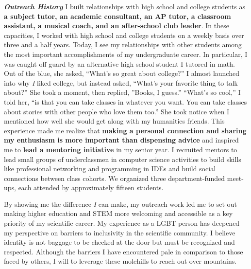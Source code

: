 \noindent
\textit{\textbf{Outreach History}}
I built relationships with high school and college students as \textbf{a subject tutor, an academic consultant, an AP tutor, a classroom assistant, a musical coach, and an after-school club leader}.
In these capacities, I worked with high school and college students on a weekly basis over three and a half years.
Today, I see my relationships with other students among the most important accomplishments of my undergraduate career.
In particular, I was caught off guard by an alternative high school student I tutored in math.
Out of the blue, she asked, ``What's so great about college?''
I almost launched into why \textit{I} liked college, but instead asked, ``What's your favorite thing to talk about?''
She took a moment, then replied, ''Books, I guess.''
``What's so cool,'' I told her, ``is that you can take classes in whatever you want.
You can take classes about stories with other people who love them too.''
She took notice when I mentioned how well she would get along with my humanities friends.
This experience made me realize that \textbf{making a personal connection and sharing my enthusiasm is more important than dispensing advice} and inspired me to \textbf{lead a mentoring initiative} in my senior year.
I recruited mentors to lead small groups of underclassmen in computer science activities to build skills like professional networking and programming in IDEs and build social connections between class cohorts.
We organized three department-funded meet-ups, each attended by approximately fifteen students.

By showing me the difference \textit{I} can make, my outreach work led me to set out making higher education and STEM more welcoming and accessible as a key priority of my scientific career.
My experience as a LGBT person has deepened my perspective on barriers to inclusivity in the scientific community.
I believe identity is not baggage to be checked at the door but must be recognized and respected.
Although the barriers I have encountered pale in comparison to those faced by others, I will to leverage these molehills to reach out over mountains.
